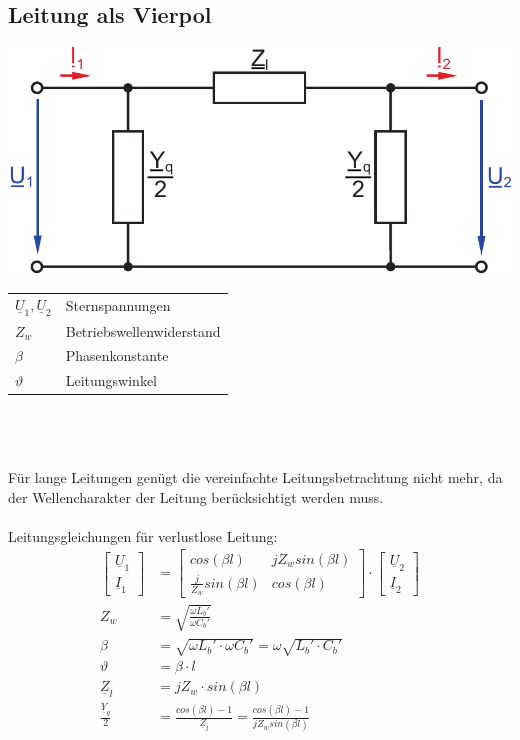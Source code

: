 \documentclass[a4paper,twocolumn,10pt]{article}
\begin{document}
\subsection{Leitung als Vierpol}
\begin{center}
\includegraphics[width=0.8\columnwidth]{Grafiken/Vierpolleitung}
\end{center}
\begin{tabular}{ll}
$\underline{U}_1,\underline{U}_2$ & Sternspannungen\\
$Z_w$ & Betriebswellenwiderstand\\
$\beta$ & Phasenkonstante\\
$\vartheta$ & Leitungswinkel
\end{tabular}\\\\\\
Für lange Leitungen genügt die vereinfachte Leitungsbetrachtung nicht mehr, da der Wellencharakter der Leitung berücksichtigt werden muss.\\\\
Leitungsgleichungen für verlustlose Leitung:
\begin{equation*}
\begin{split}
\begin{bmatrix}\underline{U}_1 \\ \underline{I}_1\end{bmatrix}&=\begin{bmatrix}cos(\beta l) & jZ_wsin(\beta l) \\ \frac{j}{Z_w}sin(\beta l) & cos(\beta l)\end{bmatrix}\cdot\begin{bmatrix}\underline{U}_2 \\ \underline{I}_2\end{bmatrix}\\
Z_w&=\sqrt{\frac{\omega L_b'}{\omega C_b'}}\\
\beta&=\sqrt{\omega L_b'\cdot \omega C_b'}=\omega\sqrt{L_b'\cdot C_b'}\\
\vartheta&=\beta\cdot l\\
\underline{Z}_l&=jZ_w\cdot sin(\beta l)\\
\frac{\underline{Y}_q}{2}&=\frac{cos(\beta l)-1}{\underline{Z}_l}=\frac{cos(\beta l)-1}{jZ_w sin(\beta l)}
\end{split}
\end{equation*}
\end{document}
